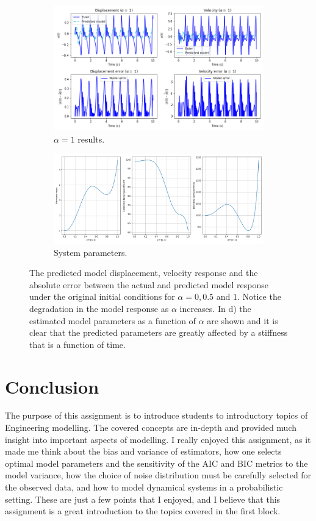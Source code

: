 \documentclass{article}
\begin{document}
\begin{figure}[!htb]
     \begin{subfigure}[b]{0.49\textwidth}
         \centering
         \includegraphics[width=\textwidth]{Q4c_fig6.png}
         \caption{$\alpha=1$ results.}
     \end{subfigure}
     \hfill
     \begin{subfigure}[b]{0.49\textwidth}
         \centering
         \includegraphics[width=\textwidth]{Q4c_fig7.png}
         \caption{System parameters.}
     \end{subfigure}
        \caption{The predicted model displacement, velocity response and the absolute error between the actual and predicted model response under the original initial conditions for $\alpha = 0, 0.5$ and $1$. Notice the degradation in the model response as $\alpha$ increases. In d) the estimated model parameters as a function of $\alpha$ are shown and it is clear that the predicted parameters are greatly affected by a stiffness that is a function of time.}
        \label{fig:Q4c_1}
\end{figure}

\section{Conclusion}
The purpose of this assignment is to introduce students to introductory topics of Engineering modelling. The covered concepts are in-depth and provided much insight into important aspects of modelling. I really enjoyed this assignment, as it made me think about the bias and variance of estimators, how one selects optimal model parameters and the sensitivity of the AIC and BIC metrics to the model variance, how the choice of noise distribution must be carefully selected for the observed data, and how to model dynamical systems in a probabilistic setting. These are just a few points that I enjoyed, and I believe that this assignment is a great introduction to the topics covered in the first block. 

\clearpage

\printbibliography
\end{document}
